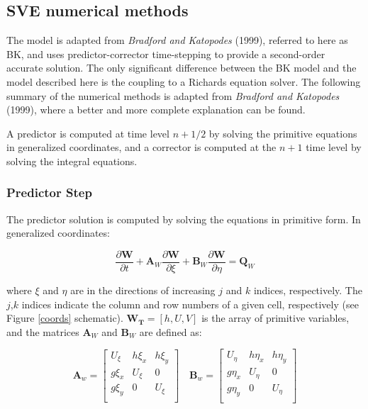 \documentclass{article}
\begin{document}
\subsection{SVE numerical methods}

 The model is adapted from  \textit{Bradford and Katopodes} (1999), referred to here as BK, 
  and uses predictor-corrector time-stepping to provide a second-order accurate solution.
 The only significant difference between the BK model and the model described here is the coupling to a Richards equation solver.  The following summary of the numerical methods is adapted from \textit{Bradford and Katopodes} (1999), where a better and more complete explanation can be found. 
  
  A predictor is computed at  time level $n + 1/2$ by solving the primitive equations in generalized coordinates, and a corrector is computed at the $n + 1$ time level by solving the integral equations.  
   
 \subsubsection*{Predictor Step}

 The predictor solution is computed by solving the equations in primitive form. In generalized coordinates:

\begin{equation}
\dfrac{\partial \mathbf{W}}{\partial t} + 
	\mathbf{A}_W	\dfrac{\partial \mathbf{W}}{\partial \xi} + 
	\mathbf{B}_W	\dfrac{\partial \mathbf{W}}{\partial \eta} =
	\mathbf{Q}_W
\label{predictor}
\end{equation}

\noindent where $\xi$ and $\eta$ are in the directions of increasing $j$ and $k$ indices, respectively.
The  $j$,$k$ indices indicate the column and row numbers of a given cell, respectively (see Figure \ref{coords} schematic).
$\mathbf{W_T} = [h, U, V]$ is the array of primitive variables, and the matrices $\mathbf{A}_W$ and $\mathbf{B}_W$ are defined as:

\[ \mathbf{A}_w = 
\begin{bmatrix}
    U_{\xi} & h \xi_x & h \xi_{y} \\
    g \xi_x &    U_{\xi}  & 0    \\
    g \xi_y &   0   & U_{\xi}    \\    
\end{bmatrix} \quad \mathbf{B}_w = 
\begin{bmatrix}
    U_{\eta} & h \eta_x    & h \eta_{y} \\
    g \eta_x &    U_{\eta}  & 0    \\
    g \eta_y &      0       & U_{\eta}    \\    
\end{bmatrix} 		
\]	
\end{document}
